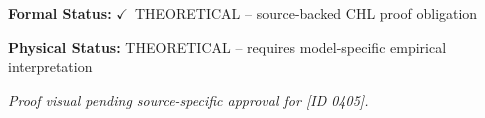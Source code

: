 \textbf{Formal Status:} \ensuremath{\checkmark}\ THEORETICAL -- source-backed CHL proof obligation

\textbf{Physical Status:} THEORETICAL -- requires model-specific empirical interpretation
\par\vspace{0.45em}
\par
\vfill
\begingroup\footnotesize\itshape
Proof visual pending source-specific approval for [ID 0405].
\par\endgroup
\vfill
\endgroup
\endgroup
